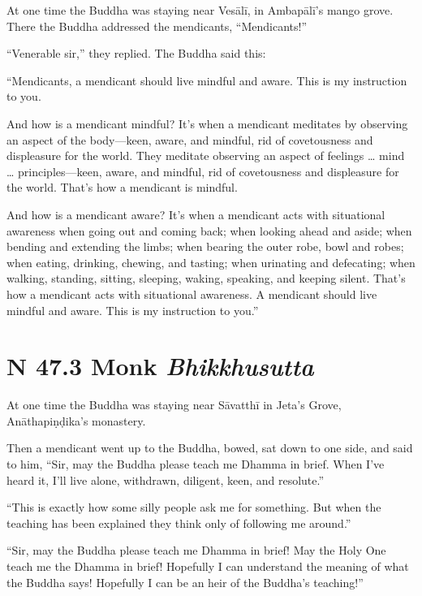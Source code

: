 \documentclass[12pt,openany]{book}%
\newcommand*{\suttatitleacronym}[1]{\smaller[2]{#1}\vspace*{.3em}}
\newcommand*{\suttatitletranslation}[1]{\linebreak{#1}}
\newcommand*{\suttatitleroot}[1]{\linebreak\smaller[2]\itshape{#1}}
\newcommand*{\tocacronym}[1]{\hspace*{-3.3em}{#1}\quad}
\newcommand*{\toctranslation}[1]{#1}
\newcommand*{\tocroot}[1]{(\textit{#1})}
\begin{document}
At one time the Buddha was staying near \textsanskrit{Vesālī}, in \textsanskrit{Ambapālī}’s mango grove. There the Buddha addressed the mendicants, “Mendicants!” 

“Venerable sir,” they replied. The Buddha said this: 

“Mendicants, a mendicant should live mindful and aware. This is my instruction to you. 

And how is a mendicant mindful? It’s when a mendicant meditates by observing an aspect of the body—keen, aware, and mindful, rid of covetousness and displeasure for the world. They meditate observing an aspect of feelings … mind … principles—keen, aware, and mindful, rid of covetousness and displeasure for the world. That’s how a mendicant is mindful. 

And how is a mendicant aware? It’s when a mendicant acts with situational awareness when going out and coming back; when looking ahead and aside; when bending and extending the limbs; when bearing the outer robe, bowl and robes; when eating, drinking, chewing, and tasting; when urinating and defecating; when walking, standing, sitting, sleeping, waking, speaking, and keeping silent. That’s how a mendicant acts with situational awareness. A mendicant should live mindful and aware. This is my instruction to you.” 

%
\section*{{\suttatitleacronym SN 47.3}{\suttatitletranslation A Monk }{\suttatitleroot Bhikkhusutta}}
\addcontentsline{toc}{section}{\tocacronym{SN 47.3} \toctranslation{A Monk } \tocroot{Bhikkhusutta}}

At one time the Buddha was staying near \textsanskrit{Sāvatthī} in Jeta’s Grove, \textsanskrit{Anāthapiṇḍika}’s monastery. 

Then a mendicant went up to the Buddha, bowed, sat down to one side, and said to him, “Sir, may the Buddha please teach me Dhamma in brief. When I’ve heard it, I’ll live alone, withdrawn, diligent, keen, and resolute.” 

“This is exactly how some silly people ask me for something. But when the teaching has been explained they think only of following me around.” 

“Sir, may the Buddha please teach me Dhamma in brief! May the Holy One teach me the Dhamma in brief! Hopefully I can understand the meaning of what the Buddha says! Hopefully I can be an heir of the Buddha’s teaching!” 
\end{document}
